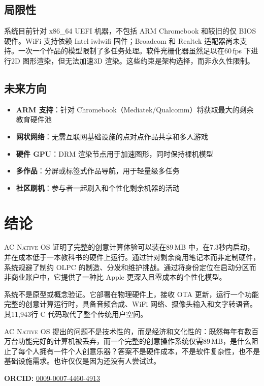 \documentclass[10pt,letterpaper,twocolumn]{article}
\newcommand{\acos}{\textsc{AC Native OS}}
\begin{document}
\subsection{局限性}

系统目前针对 x86\_64 UEFI 机器，不包括 ARM Chromebook 和较旧的仅 BIOS 硬件。WiFi 支持依赖 Intel iwlwifi 固件；Broadcom 和 Realtek 适配器尚未支持。一次一个作品的模型限制了多任务处理。软件光栅化器虽然足以在60\,fps 下进行2D 图形渲染，但无法加速3D 渲染。这些约束是架构选择，而非永久性限制。

\subsection{未来方向}

\begin{itemize}
  \item \textbf{ARM 支持}：针对 Chromebook（Mediatek/Qualcomm）将获取最大的剩余教育硬件池
  \item \textbf{网状网络}：无需互联网基础设施的点对点作品共享和多人游戏
  \item \textbf{硬件 GPU}：DRM 渲染节点用于加速图形，同时保持裸机模型
  \item \textbf{多作品}：分屏或标签式作品导航，用于轻量级多任务
  \item \textbf{社区刷机}：参与者一起刷入和个性化剩余机器的活动
\end{itemize}


\section{结论}

\acos{} 证明了完整的创意计算体验可以装在89\,MB 中，在7.3秒内启动，并在成本低于一本教科书的硬件上运行。通过针对剩余商用笔记本而非定制硬件，系统规避了制约 OLPC 的制造、分发和维护挑战。通过将身份定位在启动分区而非商业账户中，它提供了一种比 Apple 更深入且零成本的个性化模型。

系统不是原型或概念验证。它部署在物理硬件上，接收 OTA 更新，运行一个功能完整的创意计算运行时，具备音频合成、WiFi 网络、摄像头输入和文字转语音。其11,943行 C 代码取代了整个传统用户空间。

\acos{} 提出的问题不是技术性的，而是经济和文化性的：既然每年有数百万台功能完好的计算机被丢弃，而一个完整的创意操作系统仅需89\,MB，是什么阻止了每个人拥有一件个人创意乐器？答案不是硬件成本，不是软件复杂性，也不是基础设施需求。也许仅仅是因为还没有人尝试过。

\vspace{0.5em}
\noindent\textbf{ORCID:} \href{https://orcid.org/0009-0007-4460-4913}{0009-0007-4460-4913}




\end{document}
